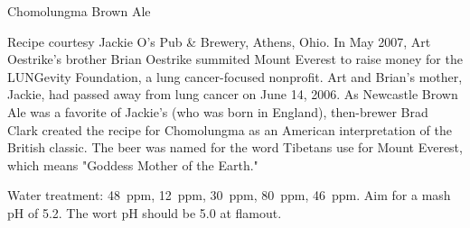 \stylesection{\stylespecialtybeer}

\begin{recipie}{Chomolungma Brown Ale}

\begin{aboutblock}
Recipe courtesy Jackie O's Pub \& Brewery, Athens, Ohio.
In May 2007, Art Oestrike's brother Brian Oestrike summited Mount Everest
to raise money for the LUNG\-evity Foundation, a lung cancer-focused nonprofit.
Art and Brian's mother, Jackie, had passed away from lung cancer on June 14, 2006.
As Newcastle Brown Ale was a favorite of Jackie's (who was born in England),
then-brewer Brad Clark created the recipe for Chomolungma as an American
interpretation of the British classic. The beer was named for the word Tibetans
use for Mount Everest, which means "Goddess Mother of the Earth."
\end{aboutblock}


\begin{methodandtiming}
 
\begin{mashsteps}
\end{mashsteps}

\begin{fermentationsteps}
\end{fermentationsteps}

\begin{directions}
Water treatment:  48~ppm,  12~ppm,  30~ppm,
 80~ppm,  46~ppm. Aim for a mash pH of 5.2. The wort pH
should be 5.0 at flamout. 
\end{directions}

\end{methodandtiming}

\pagebreak

\begin{ingredientsblock}

\begin{malts}
\end{malts}


\end{ingredientsblock}
\end{recipie}
